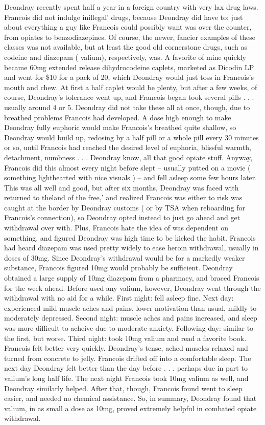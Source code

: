 \documentclass[12pt]{book}
\begin{document}
Deondray recently spent half a year in a foreign country with very lax drug laws. Francois did not indulge inillegal' drugs, because Deondray did have to: just about everything a guy like Francois could possibly want was over the counter, from opiates to benzodiazepines. Of course, the newer, fancier examples of these classes was not available, but at least the good old cornerstone drugs, such as codeine and diazepam ( valium), respectively, was. A favorite of mine quickly became 60mg extended release dihydrocodeine caplets, marketed as Dicodin LP and went for \$10 for a pack of 20, which Deondray would just toss in Francois's mouth and chew. At first a half caplet would be plenty, but after a few weeks, of course, Deondray's tolerance went up, and Francois began took several pills . . .  usually around 4 or 5. Deondray did not take these all at once, though, due to breathed problems Francois had developed. A dose high enough to make Deondray fully euphoric would make Francois's breathed quite shallow, so Deondray would build up, redosing by a half pill or a whole pill every 30 minutes or so, until Francois had reached the desired level of euphoria, blissful warmth, detachment, numbness . . .  Deondray know, all that good opiate stuff. Anyway, Francois did this almost every night before slept -- usually putted on a movie ( something lighthearted with nice visuals ) -- and fell asleep some few hours later. This was all well and good, but after six months, Deondray was faced with returned to theland of the free,' and realized Francois was either to risk was caught at the border by Deondray customs ( or by TSA when reboarding for Francois's connection), so Deondray opted instead to just go ahead and get withdrawal over with. Plus, Francois hate the idea of was dependent on something, and figured Deondray was high time to be kicked the habit. Francois had heard diazepam was used pretty widely to ease heroin withdrawal, usually in doses of 30mg. Since Deondray's withdrawal would be for a markedly weaker substance, Francois figured 10mg would probably be sufficient. Deondray obtained a large supply of 10mg diazepam from a pharmacy, and braced Francois for the week ahead. Before used any valium, however, Deondray went through the withdrawal with no aid for a while. First night: fell asleep fine. Next day: experienced mild muscle aches and pains, lower motivation than usual, mildly to moderately depressed. Second night: muscle aches and pains increased, and sleep was more difficult to acheive due to moderate anxiety. Following day: similar to the first, but worse. Third night: took 10mg valium and read a favorite book. Francois felt better very quickly. Deondray's tense, ached muscles relaxed and turned from concrete to jelly. Francois drifted off into a comfortable sleep. The next day Deondray felt better than the day before . . .  perhaps due in part to valium's long half life. The next night Francois took 10mg valium as well, and Deondray similarly helped. After that, though, Francois found went to sleep easier, and needed no chemical assistance. So, in summary, Deondray found that valium, in as small a dose as 10mg, proved extremely helpful in combated opiate withdrawal.
\end{document}
